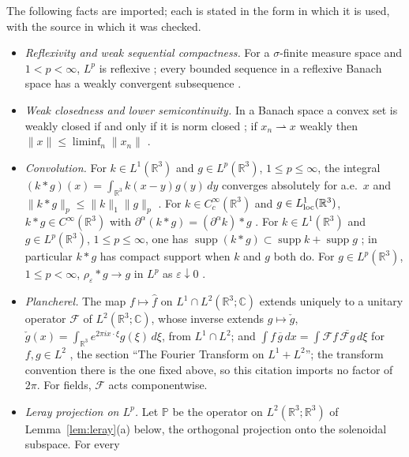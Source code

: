 \documentclass[11pt]{article}
\theoremstyle{definition}
\theoremstyle{plain}
\newcommand{\R}{\mathbb R}
\newcommand{\norm}[1]{\lVert #1\rVert}
\begin{document}
The following facts are imported; each is stated in the form in which it
is used, with the source in which it was checked.
\begin{itemize}
\item[(F1)] \emph{Reflexivity and weak sequential compactness.}  For a
 $\sigma$-finite measure space and $1<p<\infty$, $L^p$ is reflexive
 \cite[Thm.~4.10, p.~95]{Brezis2011}; every bounded sequence in a reflexive
 Banach space has a weakly convergent subsequence
 \cite[Thm.~3.18, pp.~69--70]{Brezis2011}.
\item[(F2)] \emph{Weak closedness and lower semicontinuity.}  In a Banach
 space a convex set is weakly closed if and only if it is norm closed
 \cite[Thm.~3.7, p.~60]{Brezis2011}; if $x_n\rightharpoonup x$ weakly then
 $\norm x\le\liminf_n\norm{x_n}$ \cite[Prop.~3.5(iii), p.~58]{Brezis2011}.
\item[(F3)] \emph{Convolution.}  For $k\in L^1(\R^3)$ and
 $g\in L^p(\R^3)$, $1\le p\le\infty$, the integral
 $(k*g)(x)=\int_{\R^3}k(x-y)g(y)\,dy$ converges absolutely for a.e.\ $x$
 and $\norm{k*g}_p\le\norm k_1\norm g_p$ \cite[Thm.~4.15, p.~104]{Brezis2011}.
 For $k\in C_c^\infty(\R^3)$ and $g\in L^1_{\rm loc}(\R^3)$, $k*g\in
 C^\infty(\R^3)$ with $\partial^\alpha(k*g)=(\partial^\alpha k)*g$
 \cite[Prop.~4.20, p.~107]{Brezis2011}.  For $k\in L^1(\R^3)$ and $g\in L^p(\R^3)$,
 $1\le p\le\infty$, one has
 $\operatorname{supp}(k*g)\subset\operatorname{supp}k+\operatorname{supp}g$
 \cite[Prop.~4.18, p.~106]{Brezis2011}; in particular $k*g$ has compact
 support when $k$ and $g$ both do.  For $g\in L^p(\R^3)$, $1\le p<\infty$,
 $\rho_\varepsilon*g\to g$ in $L^p$ as $\varepsilon\downarrow0$
 \cite[Thm.~4.22, p.~109]{Brezis2011}.
\item[(F4)] \emph{Plancherel.}  The map $f\mapsto\hat f$ on
 $L^1\cap L^2(\R^3;\mathbb C)$ extends uniquely to a unitary operator
 $\mathcal F$ of $L^2(\R^3;\mathbb C)$, whose inverse extends
 $g\mapsto\check g$, $\check g(x)=\int_{\R^3}e^{2\pi ix\cdot\xi}g(\xi)\,d\xi$,
 from $L^1\cap L^2$; and $\int f\,\overline g\,dx=\int\mathcal Ff\,
 \overline{\mathcal Fg}\,d\xi$ for $f,g\in L^2$
 \cite[\S2.2.4, p.~113]{Grafakos2014}, the section ``The Fourier
 Transform on $L^1+L^2$''; the transform convention there is the one fixed
 above, so this citation imports no factor of $2\pi$.  For fields,
 $\mathcal F$ acts componentwise.
\item[(F5)] \emph{Leray projection on $L^p$.}  Let $\mathbb P$ be the
 operator on $L^2(\R^3;\R^3)$ of Lemma~\ref{lem:leray}(a) below, the
 orthogonal projection onto the solenoidal subspace.  For every

\end{itemize}
\end{document}

